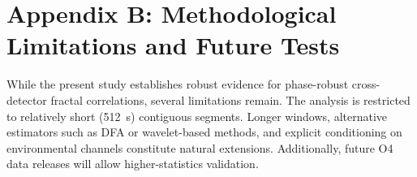 \documentclass[11pt,a4paper]{article}
\begin{document}
\section{Appendix B: Methodological Limitations and Future Tests}
While the present study establishes robust evidence for phase-robust cross-detector fractal correlations, several limitations remain. The analysis is restricted to relatively short (512~s) contiguous segments. Longer windows, alternative estimators such as DFA or wavelet-based methods, and explicit conditioning on environmental channels constitute natural extensions. Additionally, future O4 data releases will allow higher-statistics validation.
\end{document}

